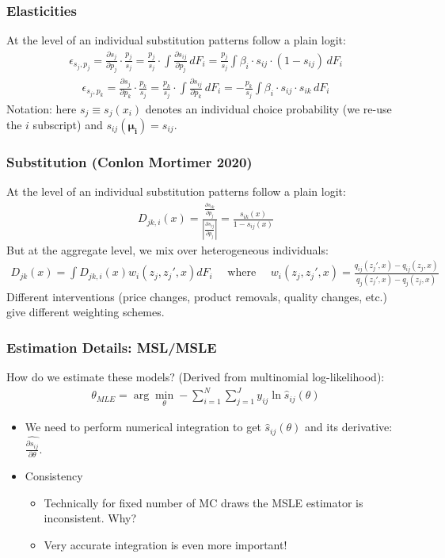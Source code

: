 \documentclass[aspectratio=169,11pt]{beamer}
\begin{document}
\begin{frame}
\frametitle{Elasticities}
At the level of an individual substitution patterns follow a plain logit:
\begin{align*}
\epsilon_{s_j,p_j} = \frac{\partial s_{j}}{\partial p_j} \cdot \frac{p_j}{s_{j}}
=\frac{p_j}{s_{j}}  \cdot \int \frac{\partial s_{ij}}{\partial p_j}  \, d F_i 
= \frac{p_j}{s_{j}}  \int \beta_i \cdot s_{ij} \cdot (1-s_{ij} ) \,d F_i 
\end{align*}
\begin{align*}
\epsilon_{s_j,p_k} = \frac{\partial s_{j}}{\partial p_k} \cdot \frac{p_k}{s_{j}}
=\frac{p_k}{s_{j}}  \cdot \int \frac{\partial s_{ij}}{\partial p_k} \,  d F_i 
=- \frac{p_k}{s_{j}}  \int \beta_i \cdot s_{ij}\cdot s_{ik}\, d F_i 
\end{align*}
Notation: here $s_j \equiv s_j(x_i)$ denotes an individual choice probability (we re-use the $i$ subscript) and $s_{ij}(\symbf{\mu_{i}})=s_{ij}$.
\end{frame}





\begin{frame}
\frametitle{Substitution (Conlon Mortimer 2020)}
At the level of an individual substitution patterns follow a plain logit:
\begin{align*}
D_{jk,i}(x) = \frac{\frac{\partial s_{ik}}{\partial p_j}}{\left| \frac{\partial s_{ij}}{\partial p_j} \right|} = \frac{s_{ik}(x)}{1-s_{ij}(x)}
\end{align*}
But at the aggregate level, we mix over heterogeneous individuals:
\begin{align*}
D_{jk}(x) = \int D_{jk,i}(x) w_i(z_j,z_j',x) d F_i \quad  \text{ where }
\quad w_i(z_j,z_j',x) = \frac{q_{ij}(z_j',x)-q_{ij}(z_j,x)}{q_{j}(z_j',x)-q_{j}(z_j,x)}
\end{align*}
Different interventions (price changes, product removals, quality changes, etc.) give different weighting schemes.
\end{frame}


\begin{frame}
\frametitle{Estimation Details: MSL/MSLE}
How do we estimate these models? (Derived from multinomial log-likelihood):
\begin{align*}
\theta_{MLE} = \arg \min_{\theta} - \sum_{i=1}^N \sum_{j=1}^J y_{ij} \ln \widehat{s}_{ij}(\theta)
\end{align*}

\begin{itemize}
\item We need to perform numerical integration to get $\widehat{s}_{ij}(\theta)$ and its derivative: $\widehat{\frac{\partial s_{ij}}{\partial \theta}}$.
\item Consistency
\begin{itemize}
\item Technically for fixed number of MC draws the MSLE estimator is inconsistent. Why?
\item Very accurate integration is even more important!
\end{itemize}
\end{itemize}

\end{frame}
\end{document}

